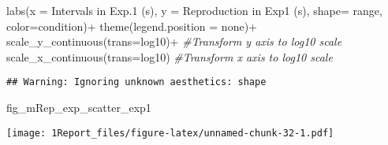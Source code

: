 \documentclass[
]{article}
\newenvironment{Shaded}{\begin{snugshade}}{\end{snugshade}}
\newcommand{\AttributeTok}[1]{\textcolor[rgb]{0.77,0.63,0.00}{#1}}
\newcommand{\CommentTok}[1]{\textcolor[rgb]{0.56,0.35,0.01}{\textit{#1}}}
\newcommand{\FunctionTok}[1]{\textcolor[rgb]{0.00,0.00,0.00}{#1}}
\newcommand{\NormalTok}[1]{#1}
\newcommand{\SpecialCharTok}[1]{\textcolor[rgb]{0.00,0.00,0.00}{#1}}
\newcommand{\StringTok}[1]{\textcolor[rgb]{0.31,0.60,0.02}{#1}}
\begin{document}
\begin{Shaded}
\begin{Highlighting}[]
  \FunctionTok{labs}\NormalTok{(}\AttributeTok{x =} \StringTok{\textquotesingle{}Intervals in Exp.1 (s)\textquotesingle{}}\NormalTok{, }\AttributeTok{y =} \StringTok{\textquotesingle{}Reproduction in Exp1 (s)\textquotesingle{}}\NormalTok{, }\AttributeTok{shape=} \StringTok{\textquotesingle{}range\textquotesingle{}}\NormalTok{, }\AttributeTok{color=}\StringTok{\textquotesingle{}condition\textquotesingle{}}\NormalTok{)}\SpecialCharTok{+}
  \FunctionTok{theme}\NormalTok{(}\AttributeTok{legend.position =} \StringTok{\textquotesingle{}none\textquotesingle{}}\NormalTok{)}\SpecialCharTok{+}
  \FunctionTok{scale\_y\_continuous}\NormalTok{(}\AttributeTok{trans=}\StringTok{\textquotesingle{}log10\textquotesingle{}}\NormalTok{)}\SpecialCharTok{+} \CommentTok{\#Transform y axis to log10 scale}
  \FunctionTok{scale\_x\_continuous}\NormalTok{(}\AttributeTok{trans=}\StringTok{\textquotesingle{}log10\textquotesingle{}}\NormalTok{) }\CommentTok{\#Transform x axis to log10 scale}
\end{Highlighting}
\end{Shaded}

\begin{verbatim}
## Warning: Ignoring unknown aesthetics: shape
\end{verbatim}

\begin{Shaded}
\begin{Highlighting}[]
\NormalTok{fig\_mRep\_exp\_scatter\_exp1}
\end{Highlighting}
\end{Shaded}

\texttt{[image: 1Report\_files/figure-latex/unnamed-chunk-32-1.pdf]}
\end{document}
